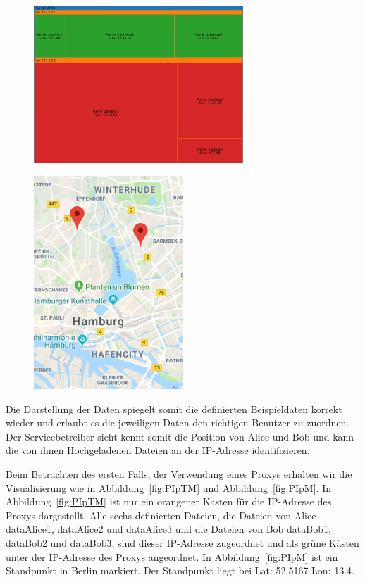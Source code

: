 \documentclass[
    fontsize=12pt,
    headings=small,
    parskip=half,           %
    bibliography=totoc,
    numbers=noenddot,       %
    open=any,               %
    ]{scrreprt}
\begin{document}
\begin{figure}[H]
\includegraphics[width=0.7\textwidth]{../pic/vec/IP-Proxy-SetA-tree3.png}
\label{fig:ungIpTM}
\end{figure}

\begin{figure}[H]
\includegraphics[width=0.5\textwidth , height=0.4\textheight]{../pic/IP-Proxy-SetA.PNG}
\label{fig:ungIpM}
\end{figure}

Die Darstellung der Daten spiegelt somit die definierten Beispieldaten korrekt wieder und erlaubt es die jeweiligen Daten den richtigen Benutzer zu zuordnen. Der Servicebetreiber sieht kennt somit die Position von Alice und Bob und kann die von ihnen Hochgeladenen Dateien an der IP-Adresse identifizieren.

Beim Betrachten des ersten Falls, der Verwendung eines Proxys erhalten wir die Visualisierung wie in Abbildung~\ref{fig:PIpTM} und Abbildung~\ref{fig:PIpM}.
In Abbildung~\ref{fig:PIpTM} ist nur ein orangener Kasten für die IP-Adresse des Proxys dargestellt.
Alle sechs definierten Dateien, die Dateien von Alice dataAlice1, dataAlice2 und dataAlice3 und die Dateien von Bob dataBob1, dataBob2 und dataBob3, sind dieser IP-Adresse zugeordnet und als grüne Kästen unter der IP-Adresse des Proxys angeordnet.
In Abbildung~\ref{fig:PIpM} ist ein Standpunkt in Berlin markiert.
Der Standpunkt liegt bei \ac{Lat}: 52.5167 \ac{Lon}: 13.4. 
\end{document}
